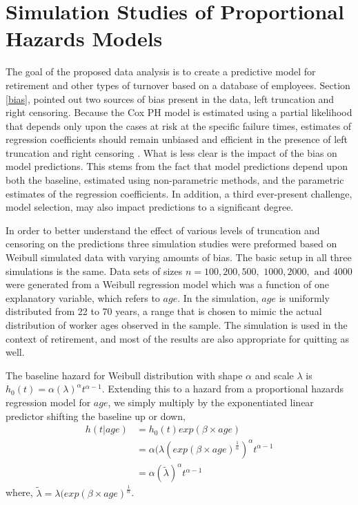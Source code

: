  \section{Simulation Studies of Proportional Hazards Models}
 
 The goal of the proposed data analysis is to create a predictive model for retirement and other types of turnover based on a database of employees. Section \ref{bias}, pointed out two sources of bias present in the data, left truncation and right censoring.  Because the Cox PH model is estimated using a partial likelihood that depends only upon the cases at risk at the specific failure times, estimates of regression coefficients should remain unbiased and efficient in the presence of left truncation and right censoring \citep{Harrell2002}.  What is less clear is the impact of the bias on model predictions. This stems from the fact that model predictions depend upon both the baseline, estimated using non-parametric methods, and the parametric estimates of the regression coefficients.  In addition, a third ever-present challenge, model selection, may also impact predictions to a significant degree.
 
 In order to better understand the effect of various levels of truncation and censoring on the predictions three simulation studies were preformed based on Weibull simulated data with varying amounts of bias. The basic setup in all three simulations is the same. Data sets of sizes $n =100, 200, 500,$ $1000, 2000,$ $\text{and } 4000$ were generated from a Weibull regression model which was a function of one explanatory variable, which refers to  $age$.  In the simulation, $age$ is uniformly distributed from 22 to 70 years, a range that is chosen to mimic the actual distribution of worker ages observed in the sample. The simulation is used in the context of retirement, and most of the results are also appropriate for quitting as well.
 
 The baseline hazard for Weibull distribution with shape $\alpha$ and scale $\lambda$ is $h_0(t)=\alpha(\lambda)^\alpha t^{\alpha-1}$.  Extending this to a hazard from a proportional hazards regression model for $age$, we simply multiply by the exponentiated linear predictor shifting the baseline up or down,
 \begin{equation} \label{eq:weibull}
 \begin{split}%
 h(t|age) & =h_0(t)exp(\beta \times age) \\
 &=\alpha (\lambda (exp(\beta \times age)^{\frac{1}{\alpha}})^\alpha t^{\alpha-1} \\
 &=\alpha(\tilde{\lambda} )^\alpha t^{\alpha-1}
 \end{split}
 \end{equation}
 where, $\tilde{\lambda}=\lambda (exp(\beta \times age)^{\frac{1}{\alpha}}$.
 

